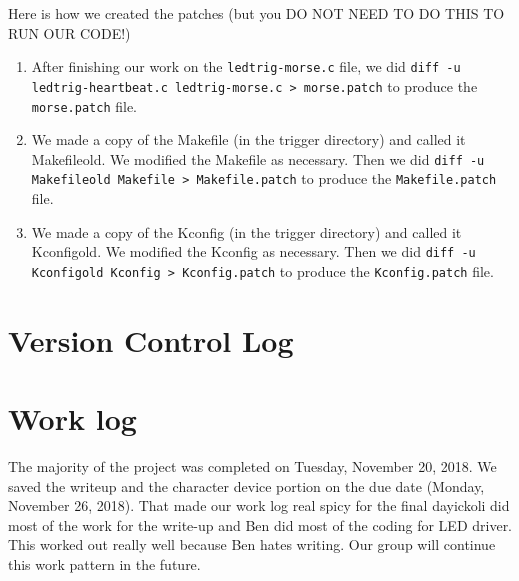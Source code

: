 \documentclass[10pt,english]{article}
\begin{document}
Here is how we created the patches (but you DO NOT NEED TO DO THIS TO RUN OUR CODE!)
\begin{enumerate}
\item After finishing our work on the \verb|ledtrig-morse.c| file, we did \verb|diff -u ledtrig-heartbeat.c ledtrig-morse.c > morse.patch| to produce the \verb|morse.patch| file. 
\item We made a copy of the Makefile (in the trigger directory) and called it Makefileold. We modified the Makefile as necessary. Then we did \verb|diff -u Makefileold Makefile > Makefile.patch| to produce the \verb|Makefile.patch| file.
\item We made a copy of the Kconfig (in the trigger directory) and called it Kconfigold. We modified the Kconfig as necessary. Then we did \verb|diff -u Kconfigold Kconfig > Kconfig.patch| to produce the \verb|Kconfig.patch| file.
\end{enumerate}



\section{Version Control Log}



\section{Work log}

The majority of the project was completed on Tuesday, November 20, 2018. We saved the writeup and the character device portion on the due date (Monday, November 26, 2018). That made our work log real spicy for the final dayickoli did most of the work for the write-up and Ben did most of the coding for LED driver. This worked out really well because Ben hates writing. Our group will continue this work pattern in the future.
 
\end{document}
